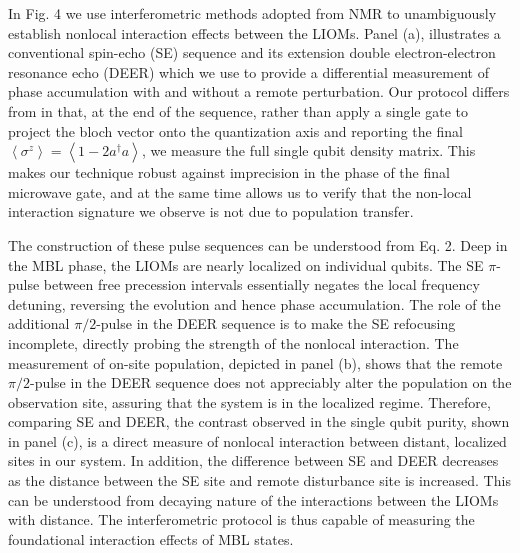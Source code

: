 In Fig. 4 we use interferometric methods adopted from NMR to unambiguously establish nonlocal interaction effects between the LIOMs.\autocite{KnapPRL2014}
Panel (a), illustrates a conventional spin-echo (SE) sequence and its extension double electron-electron resonance echo (DEER) which we use to provide a differential measurement of phase accumulation with and without a remote perturbation.
Our protocol differs from \cite{KnapPRL2014} in that, at the end of the sequence,
rather than apply a single gate to project the bloch vector onto the quantization axis and reporting the final $\left< \sigma^z \right> = \left< 1 - 2 a^{\dagger} a \right>$, we measure the full single qubit density matrix.
This makes our technique robust against imprecision in the phase of the final microwave gate,
and at the same time allows us to verify that the non-local interaction signature we observe is not due to population transfer.

The construction of these pulse sequences can be understood from Eq. 2.
Deep in the MBL phase, the LIOMs are nearly localized on individual qubits.
The SE $\pi$-pulse between free precession intervals essentially negates the local frequency detuning, reversing the evolution and hence phase accumulation.
The role of the additional $\pi/2$-pulse in the DEER sequence is to make the SE refocusing incomplete, directly probing the strength of the nonlocal interaction.
The measurement of on-site population, depicted in panel (b), shows that the remote $\pi / 2$-pulse in the DEER sequence does not appreciably alter the population on the observation site,
assuring that the system is in the localized regime.
Therefore, comparing SE and DEER, the contrast observed in the single qubit purity, shown in panel (c), is a direct measure of nonlocal interaction between distant, localized sites in our system.
In addition, the difference between SE and DEER decreases as the distance between the SE site and remote disturbance site is increased.
This can be understood from decaying nature of the interactions between the LIOMs with distance.
The interferometric protocol is thus capable of measuring the foundational interaction effects of MBL states.




